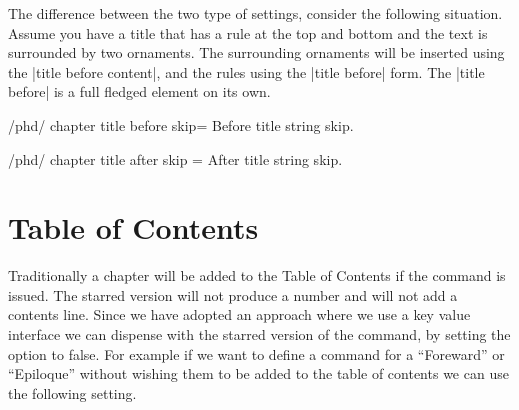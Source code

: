 \begin{decription}
The difference between the two type of settings, consider the following situation. Assume you have a title that has a rule at the top and bottom and the text is surrounded by two ornaments. The surrounding ornaments will be inserted using the |title before content|, and the rules using the |title before| form. The |title before| is a full fledged element on its own. 

%
%



 
\begin{docKey}{/phd/ chapter title before skip}{= }{}
Before title string skip.
\end{docKey}

\begin{docKey}{/phd/ chapter title after skip}{ =  }{}
After title string skip.
\end{docKey}

\lorem 
%
%
%         
%
%



\section{Table of Contents}

Traditionally a chapter will be added to the Table of Contents if the  command is issued. The starred version will not produce a number and will not add a contents line. Since we have adopted an approach where we use a key value interface we can dispense with the starred version of the command, by setting the  option to false. For example if we want to define a command for a ``Foreward'' or ``Epiloque'' without wishing them to be added to the table of contents we can use the following setting.




\end{decription}
